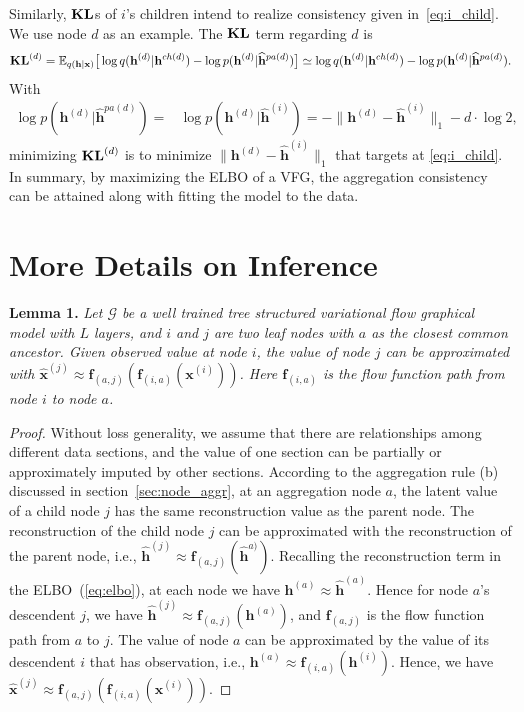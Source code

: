 \documentclass[twoside]{article}
\begin{document}
Similarly,  $\textbf{\text{KL}}$s  of $i$'s children intend to realize consistency given in~\eqref{eq:i_child}. We use node $d$ as an example.  The $\textbf{\text{KL}}$ term regarding $d$ is 
\begin{align*}%
\textbf{\text{KL}}^{(d)} = \mathbb{E}_{q(\mathbf{h}|\mathbf{x})}\big[  \log q(\mathbf{h}^{(d)}|\mathbf{h}^{ch(d)})  - \log p(\mathbf{h}^{(d)}|\widehat{\mathbf{h}}^{pa(d)}) \big]  \simeq  \log q(\mathbf{h}^{(d)}|\mathbf{h}^{ch(d)})  - \log p(\mathbf{h}^{(d)}|\widehat{\mathbf{h}}^{pa(d)}).
\end{align*} 
With 
\begin{align*}%
 \log p(\mathbf{h}^{(d)}|\widehat{\mathbf{h}}^{pa(d)})= & \log p(\mathbf{h}^{(d)}|\widehat{\mathbf{h}}^{(i)}) 
 = -\|\mathbf{h}^{(d)}- \widehat{\mathbf{h}}^{(i)}\|_1 - d\cdot\log2,
\end{align*} 
minimizing $\textbf{\text{KL}}^{(d)}$ is to minimize $\|\mathbf{h}^{(d)}- \widehat{\mathbf{h}}^{(i)}\|_1$ that targets at \eqref{eq:i_child}. In summary, by maximizing the ELBO of a VFG, the aggregation consistency can be  attained along with fitting the model to the data. 

\section{More Details on Inference} \label{sec:infer_supp}
\textbf{Lemma 1.} {\it Let $\mathcal{G}$ be a well trained tree structured variational flow graphical model with $L$ layers, and $i$ and $j$ are two leaf nodes with $a$ as the closest common ancestor. 
Given observed value at node $i$, the value of node $j$ can be approximated with $\widehat{\mathbf{x}}^{(j)} \approx  \mathbf{f}_{(a,j)}(\mathbf{f}_{(i, a)}(\mathbf{x}^{(i)}))$. Here $\mathbf{f}_{(i, a)}$ is the flow function path from node $i$ to node $a$. 
}
\begin{proof}
Without loss generality, we assume that there are relationships among different data sections, and the value of one section can be partially or approximately imputed by other sections. 
According to the aggregation rule (b) discussed in section~\ref{sec:node_aggr}, at an aggregation node  $a$, the latent value of a child node $j$ has the same reconstruction value as the parent node.  
The reconstruction of the child node $j$ can be approximated with the reconstruction of the parent node, i.e., $\widehat{\mathbf{h}}^{(j)} \approx \mathbf{f}_{(a,j)}(\widehat{\mathbf{h}}^{a)})$. 
Recalling the reconstruction term in the ELBO~(\ref{eq:elbo}), at each node we have $\mathbf{h}^{(a)} \approx \widehat{\mathbf{h}}^{(a)}$. Hence for node $a$'s descendent $j$, we have $\widehat{\mathbf{h}}^{(j)} \approx \mathbf{f}_{(a,j)}(\mathbf{h}^{(a)})$, and $\mathbf{f}_{(a,j)}$ is the flow function path from $a$ to $j$. 
The value of node $a$ can be approximated by the value of its descendent $i$ that has observation, i.e., $\mathbf{h}^{(a)} \approx \mathbf{f}_{(i,a)}(\mathbf{h}^{(i)})$. Hence, we have $\widehat{\mathbf{x}}^{(j)} \approx  \mathbf{f}_{(a,j)}(\mathbf{f}_{(i, a)}(\mathbf{x}^{(i)}))$.
\end{proof}
\end{document}
